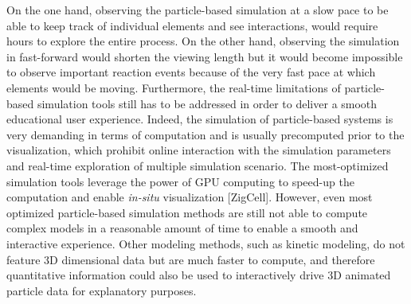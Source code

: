 On the one hand, observing the particle-based simulation at a slow pace to be able to keep track of individual elements and see interactions, would require hours to explore the entire process.
On the other hand, observing the simulation in fast-forward would shorten the viewing length but it would become impossible to observe important reaction events because of the very fast pace at which elements would be moving.
Furthermore, the real-time limitations of particle-based simulation tools still has to be addressed in order to deliver a smooth educational user experience.
Indeed, the simulation of particle-based systems is very demanding in terms of computation and is usually precomputed prior to the visualization, which prohibit online interaction with the simulation parameters and real-time exploration of multiple simulation scenario.
The most-optimized simulation tools leverage the power of GPU computing to speed-up the computation and enable \textit{in-situ} visualization [ZigCell].
However, even most optimized particle-based simulation methods are still not able to compute complex models in a reasonable amount of time to enable a smooth and interactive experience.
Other modeling methods, such as kinetic modeling, do not feature 3D dimensional data but are much faster to compute, and therefore quantitative information could also be used to interactively drive 3D animated particle data for explanatory purposes.








 







